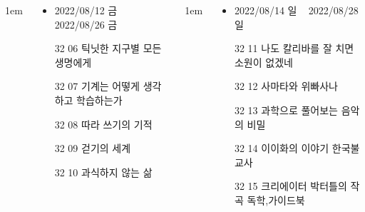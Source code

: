 \documentclass[	20pt, 
							a1paper, 
							portrait, %
							margin=0mm, %
							innermargin=10mm,  		%
							colspace=5mm, 
							subcolspace=0mm
							]{tikzposter}
\begin{document}
\begin{columns}
			{
					\setlength{\leftmargini}{4em}
					\setlength{\labelsep} {1em}
				\begin{LARGE}
					\begin{itemize}
					\item 	2022/08/12 금 ~ 2022/08/26 금
					\item 	[32 06] 틱닛한 지구별 모든 생명에게
					\item 	[32 07] 기계는 어떻게 생각하고 학습하는가
					\item 	[32 08] 따라 쓰기의 기적
					\item 	[32 09] 걷기의 세계
					\item 	[32 10] 과식하지 않는 삶
					\end{itemize}
				\end{LARGE}
			}





			{
					\setlength{\leftmargini}{4em}
					\setlength{\labelsep} {1em}
				\begin{LARGE}
					\begin{itemize}
					\item 	2022/08/14 일 ~ 2022/08/28 일
					\item 	[32 11]	나도 칼리바를 잘 치면 소원이 없겠네
					\item 	[32 12]	사마타와 위빠사나
					\item 	[32 13]	과학으로 풀어보는 음악의 비밀
					\item 	[32 14]	이이화의 이야기 한국불교사
					\item 	[32 15]	크리에이터 박터틀의 작곡 독학,가이드북
					\end{itemize}
				\end{LARGE}
			}



\end{columns}
\end{document}
